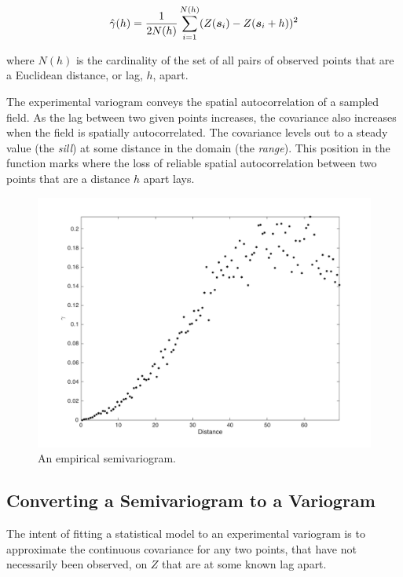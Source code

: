 \begin{equation}
    \label{eq:exp_var}
    \hat{\gamma}(h) = \frac{1}{2N(h)}\sum_{i=1}^{N(h)} (Z({\it{\boldsymbol{s}}}_i) - Z({\it{\boldsymbol{s}}}_i+h))^2
\end{equation}

\noindent where $N(h)$ is the cardinality of the set of all pairs of observed points that are a Euclidean distance, or lag, $h$, apart.

The experimental variogram conveys the spatial autocorrelation of a sampled field. As the lag between two given points increases, the covariance also increases when the field is spatially autocorrelated. The covariance levels out to a steady value (the \textit{sill}) at some distance in the domain (the \textit{range}). This position in the function marks where the loss of reliable spatial autocorrelation between two points that are a distance $h$ apart lays.

\begin{figure}[ht!]
    \centering    
    \includegraphics[width=0.8\linewidth]{figures/exp_variogram.png}
    \ssp
    \caption{An empirical semivariogram.}
    \label{fig:emp_semiv}
\end{figure}

\subsection{Converting a Semivariogram to a Variogram} \label{sec:semitovar}
The intent of fitting a statistical model to an experimental variogram is to approximate the continuous covariance for any two points, that have not necessarily been observed, on $Z$ that are at some known lag apart.


